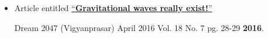 


\begin{itemize}
    \item Article entitled \href{http://vigyanprasar.gov.in/wp-content/uploads/dream-april-2016-eng.pdf}{``\textbf{Gravitational waves really exist!}''}
    
    
  Dream 2047 (Vigyanprasar) April 2016 Vol. 18 No. 7  pg. 28-29 \textbf{ 2016}. 


\end{itemize}

 